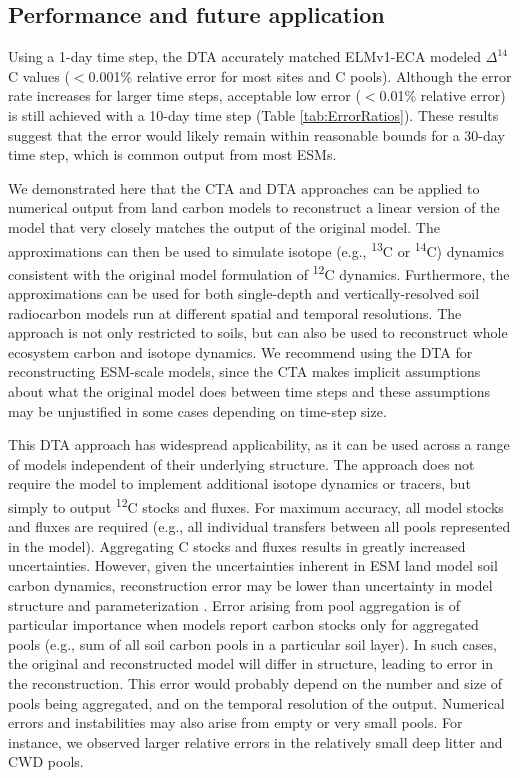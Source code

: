 \documentclass[draft]{agujournal2019}
\begin{document}
\subsection{Performance and future application}
Using a 1-day time step, the DTA accurately matched ELMv1-ECA modeled $\Delta^{14}$C values ($<$0.001\% relative error for most sites and C pools). Although the error rate increases for larger time steps, acceptable low error ($<$0.01\% relative error) is still achieved with a 10-day time step (Table \ref{tab:ErrorRatios}). These results suggest that the error would likely remain within reasonable bounds for a 30-day time step, which is common output from most ESMs.

We demonstrated here that the CTA and DTA  approaches can be applied to numerical output from land carbon models to reconstruct a linear version of the model that very closely matches the output of the original model. The approximations can then be used to simulate isotope (e.g., \textsuperscript{13}C or \textsuperscript{14}C) dynamics consistent with the original model formulation of \textsuperscript{12}C dynamics. Furthermore, the approximations can be used for both single-depth and vertically-resolved soil radiocarbon models run at different spatial and temporal resolutions. The approach is not only restricted to soils, but can also be used to reconstruct whole ecosystem carbon and isotope dynamics.  We recommend using the DTA for reconstructing ESM-scale models, since the CTA makes implicit assumptions about what the original model does between time steps and these assumptions may  be unjustified in some cases depending on time-step size.

This DTA approach has widespread applicability, as it can be used across a range of models independent of their underlying structure. The approach does not require the model to implement additional isotope dynamics or tracers, but simply to output \textsuperscript{12}C stocks and fluxes. For maximum accuracy, all model stocks and fluxes are required (e.g., all individual transfers between all pools represented in the model). Aggregating C stocks and fluxes results in greatly increased uncertainties. However, given the uncertainties inherent in ESM land model soil carbon dynamics, reconstruction error may be lower than uncertainty in model structure and parameterization \cite{Chen2009JGR}. Error arising from pool aggregation is of particular importance when models report carbon stocks only for aggregated pools (e.g., sum of all soil carbon pools in a particular soil layer). In such cases, the original and reconstructed model will differ in structure, leading to error in the reconstruction. This error would probably depend on the number and size of pools being aggregated, and on the temporal resolution of the output. Numerical errors and instabilities may also arise from empty or very small pools. For instance, we observed larger relative errors in the relatively small deep litter and CWD pools.
\end{document}
